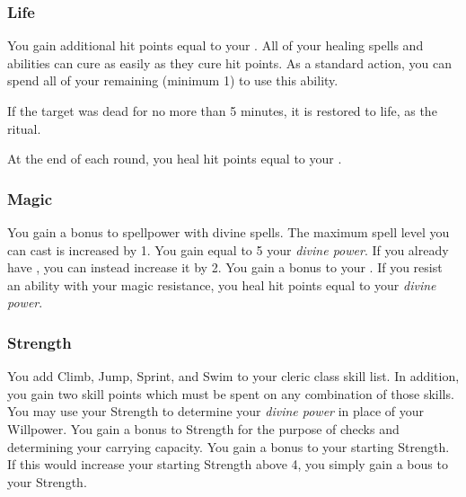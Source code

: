         \subsubsection{Life}
             You gain additional hit points equal to your .
             All of your healing spells and abilities can cure  as easily as they cure hit points.
             As a standard action, you can spend all of your remaining  (minimum 1) to use this ability.
            \begin{ability}
                \begin{spelltargetinginfo}
                \end{spelltargetinginfo}
                \begin{spelleffects}
                    \spelleffect If the target was dead for no more than 5 minutes, it is restored to life, as the  ritual.
                \end{spelleffects}
            \end{ability}
             At the end of each round, you heal hit points equal to your .

        \subsubsection{Magic}
             You gain a  bonus to spellpower with divine spells.
             The maximum spell level you can cast is increased by 1.
             You gain  equal to 5 \add your \textit{divine power}.
            If you already have , you can instead increase it by 2.
             You gain a  bonus to your .
            If you resist an ability with your magic resistance, you heal hit points equal to your \textit{divine power}.

        \subsubsection{Strength}
             You add Climb, Jump, Sprint, and Swim to your cleric class skill list.
            In addition, you gain two skill points which must be spent on any combination of those skills.
             You may use your Strength to determine your \textit{divine power} in place of your Willpower.
             You gain a  bonus to Strength for the purpose of checks and determining your carrying capacity.
             You gain a  bonus to your starting Strength.
            If this would increase your starting Strength above 4, you simply gain a  bous to your Strength.

